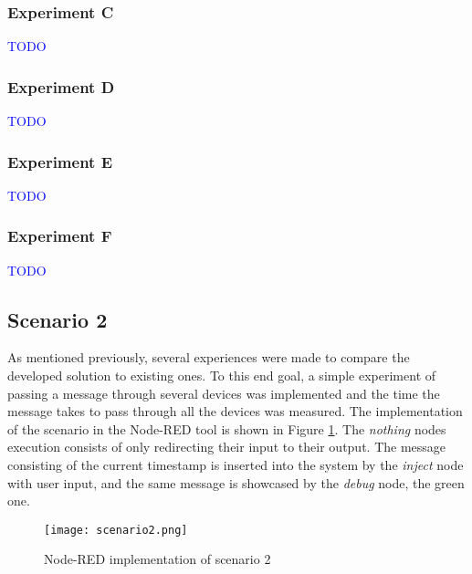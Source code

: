 \subsubsection{Experiment C}

\textcolor{blue}{TODO}


\subsubsection{Experiment D}

\textcolor{blue}{TODO}


\subsubsection{Experiment E}

\textcolor{blue}{TODO}


\subsubsection{Experiment F}

\textcolor{blue}{TODO}


\subsection{Scenario 2}\label{sec:discussion_scenario2}

As mentioned previously, several experiences were made to compare the developed solution to existing ones. To this end goal, a simple experiment of passing a message through several devices was implemented and the time the message takes to pass through all the devices was measured. The implementation of the scenario in the Node-RED tool is shown in Figure \ref{fig:scenario2_node_red}. The \textit{nothing} nodes execution consists of only redirecting their input to their output. The message consisting of the current timestamp is inserted into the system by the \textit{inject} node with user input, and the same message is showcased by the \textit{debug} node, the green one.

\begin{figure}[h]
\centering
\texttt{[image: scenario2.png]}
\caption[Node-RED implementation of scenario 2]{Node-RED implementation of scenario 2}\label{fig:scenario2_node_red}
\end{figure}

